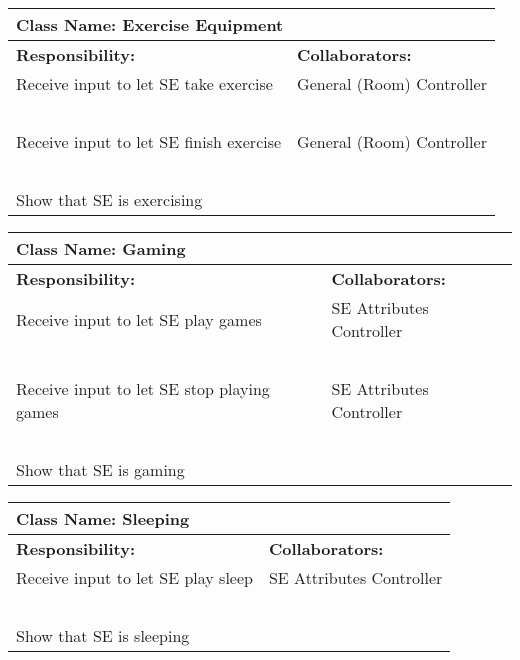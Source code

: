 \documentclass[]{article}
\begin{document}
\begin{table}[H]
    \centering
    \begin{tabular}{|p{7.5cm}|p{7.5cm}|}
        \hline
        \multicolumn{2}{|l|}{\textbf{Class Name:} Exercise Equipment}\\
        \hline
        \textbf{Responsibility:} & \textbf{Collaborators:}\\
        \hline
        Receive input to let SE take exercise & General (Room) Controller\\
        ~ & ~\\
        Receive input to let SE finish exercise & General (Room) Controller\\
        ~ & ~\\
        Show that SE is exercising & ~\\
        \hline
    \end{tabular}
\end{table}

\begin{table}[H]
    \centering
    \begin{tabular}{|p{7.5cm}|p{7.5cm}|}
        \hline
        \multicolumn{2}{|l|}{\textbf{Class Name:} Gaming}\\
        \hline
        \textbf{Responsibility:} & \textbf{Collaborators:}\\
        \hline
        Receive input to let SE play games & SE Attributes Controller\\
        ~ & ~\\
        Receive input to let SE stop playing games & SE Attributes Controller\\
        ~ & ~\\
        Show that SE is gaming & ~\\
        \hline
    \end{tabular}
\end{table}

\begin{table}[H]
    \centering
    \begin{tabular}{|p{7.5cm}|p{7.5cm}|}
        \hline
        \multicolumn{2}{|l|}{\textbf{Class Name:} Sleeping}\\
        \hline
        \textbf{Responsibility:} & \textbf{Collaborators:}\\
        \hline
        Receive input to let SE play sleep & SE Attributes Controller\\
        ~ & ~\\
        Show that SE is sleeping & ~\\
        \hline
    \end{tabular}
\end{table}
\end{document}
